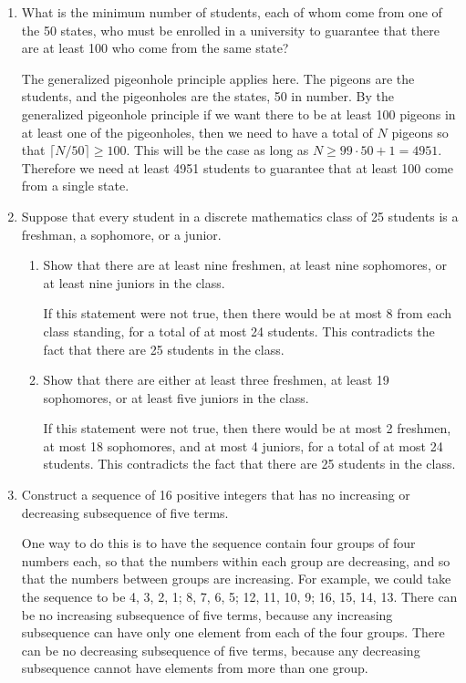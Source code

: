 \documentclass[11pt]{article}
\begin{document}
\begin{enumerate}[label=\textbf{\arabic*.}]
	\item What is the minimum number of students, each of whom come from one of the 50 states, who must be enrolled in a university to guarantee that there are at least 100 who come from the same state?
	
	The generalized pigeonhole principle applies here. The pigeons are the students, and the pigeonholes are the states, 50 in number. By the generalized pigeonhole principle if we want there to be at least 100 pigeons in at least one of the pigeonholes, then we need to have a total of $N$ pigeons so that $\lceil N / 50 \rceil \geq 100$. This will be the case as long as $N \geq 99 \cdot 50 + 1 = 4951$. Therefore we need at least 4951 students to guarantee that at least 100 come from a single state.
	
	\item Suppose that every student in a discrete mathematics class of 25 students is a freshman, a sophomore, or a junior.
	
	\begin{enumerate}[label=\textbf{\alph*)}]
		\item Show that there are at least nine freshmen, at least nine sophomores, or at least nine juniors in the class.
		
		If this statement were not true, then there would be at most 8 from each class standing, for a total of at most 24 students. This contradicts the fact that there are 25 students in the class.
		
		\item Show that there are either at least three freshmen, at least 19 sophomores, or at least five juniors in the class.
		
		If this statement were not true, then there would be at most 2 freshmen, at most 18 sophomores, and at most 4 juniors, for a total of at most 24 students. This contradicts the fact that there are 25 students in the class.
	\end{enumerate}

	\item Construct a sequence of 16 positive integers that has no increasing or decreasing subsequence of five terms.
	
	One way to do this is to have the sequence contain four groups of four numbers each, so that the numbers within each group are decreasing, and so that the numbers between groups are increasing. For example, we could take the sequence to be 4, 3, 2, 1; 8, 7, 6, 5; 12, 11, 10, 9; 16, 15, 14, 13. There can be no increasing subsequence of five terms, because any increasing subsequence can have only one element from each of the four groups. There can be no decreasing subsequence of five terms, because any decreasing subsequence cannot have elements from more than one group.
\end{enumerate}
\end{document}
